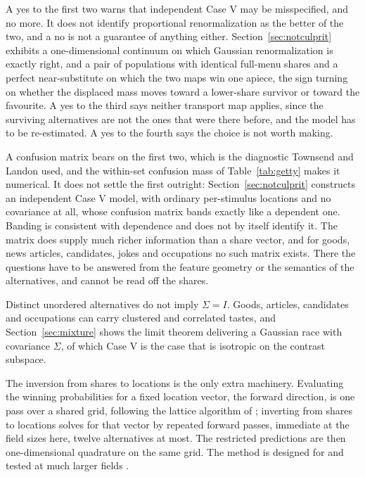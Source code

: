 \documentclass[11pt]{article}
\theoremstyle{italichead}
\begin{document}
A yes to the first two warns that independent Case V may be misspecified, and no more. It does
not identify proportional renormalization as the better of the two, and a no is not a guarantee
of anything either.
Section~\ref{sec:notculprit} exhibits a one-dimensional continuum on which Gaussian
renormalization is exactly right, and a pair of populations with identical full-menu shares and a
perfect near-substitute on which the two maps win one apiece, the sign turning on whether the
displaced mass moves toward a lower-share survivor or toward the favourite. A yes to the third
says neither transport map applies, since the surviving alternatives are not the ones that were
there before, and the model has to be re-estimated. A yes to the fourth says the choice is not
worth making.

A confusion matrix bears on the first two, which is the diagnostic Townsend and Landon
\cite{townsendlandon1982} used, and the within-set confusion mass of Table~\ref{tab:getty}
makes it numerical. It does not settle the first outright: Section~\ref{sec:notculprit}
constructs an independent Case V model, with ordinary per-stimulus locations and no covariance
at all, whose confusion matrix bands exactly like a dependent one. Banding is consistent with
dependence and does not by itself identify it. The matrix does supply much richer information
than a share vector, and for goods, news articles, candidates, jokes and occupations
no such matrix exists. There the
questions have to be answered from the feature geometry or the semantics of the alternatives,
and cannot be read off the shares.

Distinct unordered alternatives do not imply $\Sigma = I$. Goods, articles, candidates and occupations can carry clustered and
correlated tastes, and Section~\ref{sec:mixture} shows the limit theorem delivering a Gaussian
race with covariance $\Sigma$, of which Case V is the case that is isotropic on the contrast
subspace.

The inversion from shares to locations is the only extra machinery. Evaluating the winning
probabilities for a fixed location vector, the forward direction, is one pass over a shared grid,
following the lattice algorithm of \cite{cotton2021}; inverting from shares to locations solves
for that vector by repeated forward passes, immediate at the field sizes here, twelve
alternatives at most. The restricted predictions are then one-dimensional quadrature on the same
grid. The method is designed for and tested at much larger fields \cite{cotton2021}.
\end{document}
